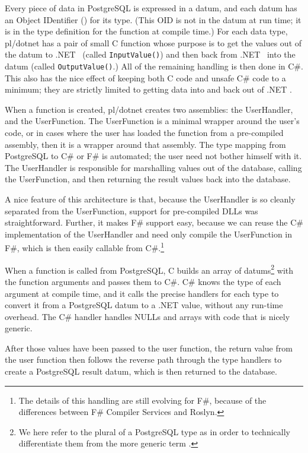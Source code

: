 \documentclass[sigconf,techreport,authorversion,nonacm]{acmart}
\newcommand{\dotnet}{.NET }
\begin{document}
Every piece of data in PostgreSQL is expressed in a datum, and each
datum has an Object IDentifier () for its
type. (This OID is not in the datum at run time; it is in the type
definition for the function at compile time.) For each data type,
pl/dotnet has a pair of small C function whose purpose is to get
the values out of the datum to \dotnet\ (called \texttt{InputValue()})
and then back from \dotnet\ into the datum (called \texttt{OutputValue()}.)
All of the remaining handling is then done in C\#. This also has
the nice effect of keeping both C code and unsafe C\# code to a
minimum; they are strictly limited to getting data into and back
out of \dotnet.

When a function is created, pl/dotnet creates two assemblies: the
UserHandler, and the UserFunction.  The UserFunction is a minimal
wrapper around the user's code, or in cases where the user has
loaded the function from a pre-compiled assembly, then it is a
wrapper around that assembly.  The type mapping from PostgreSQL to
C\# or F\# is automated; the user need not bother himself with it.
The UserHandler is responsible for marshalling values out of the
database, calling the UserFunction, and then returning the result
values back into the database.

A nice feature of this architecture is that, because the
UserHandler is so cleanly separated from the UserFunction, support
for pre-compiled DLLs was straightforward. Further, it makes F\#
support easy, because we can reuse the C\# implementation of the
UserHandler and need only compile the UserFunction in F\#, which
is then easily callable from C\#.\footnote{The details of this
handling are still evolving for F\#, because of the differences
between F\# Compiler Services and Roslyn.}

When a function is called from PostgreSQL, C builds an array of
datums\footnote{We here refer to the plural of a PostgreSQL type
 as  in order to technically
differentiate them from the more generic term .}
with the function arguments and passes them to C\#. C\# knows the
type of each argument at compile time, and it calls the precise
handlers for each type to convert it from a PostgreSQL datum to a
\dotnet value, without any run-time overhead.  The C\# handler
handles NULLs and arrays with code that is nicely generic.

After those values have been passed to the user function, the return
value from the user function then follows the reverse path through
the type handlers to create a PostgreSQL result datum, which is
then returned to the database.
\end{document}
